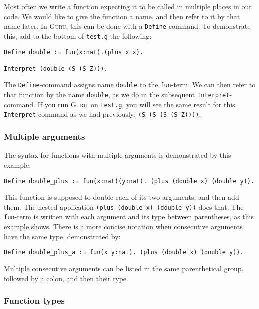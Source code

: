 \documentclass{book}[12pt]
\newcommand{\guru}[0]{\textsc{Guru}}
\begin{document}
Most often we write a function expecting it to be called in multiple
places in our code.  We would like to give the function a name, and
then refer to it by that name later.  In \textsc{Guru}, this can be
done with a \texttt{Define}-command. To demonstrate this, add to the
bottom of \texttt{test.g} the following:

\begin{verbatim}
Define double := fun(x:nat).(plus x x).

Interpret (double (S (S Z))).
\end{verbatim}

\noindent The \texttt{Define}-command assigns name \texttt{double} to
the \texttt{fun}-term.  We can then refer to that function by
the name \texttt{double}, as we do in the subsequent
\texttt{Interpret}-command.  If you run \guru\ on \texttt{test.g},
you will see the same result for this \texttt{Interpret}-command
as we had previously: \texttt{(S (S (S (S Z))))}.

\subsubsection{Multiple arguments}

The syntax for functions with multiple arguments is demonstrated
by this example:

\begin{verbatim}
Define double_plus := fun(x:nat)(y:nat). (plus (double x) (double y)).
\end{verbatim}

\noindent This function is supposed to double each of its two
arguments, and then add them.  The nested application \texttt{(plus
(double x) (double y))} does that.  The \texttt{fun}-term is
written with each argument and its type between parentheses, as this
example shows.  There is a more concise notation when consecutive
arguments have the same type, demonstrated by:

\begin{verbatim}
Define double_plus_a := fun(x y:nat). (plus (double x) (double y)).
\end{verbatim}

\noindent Multiple consecutive arguments can be listed in the same
parenthetical group, followed by a colon, and then their type.

\subsubsection{Function types}
\end{document}
